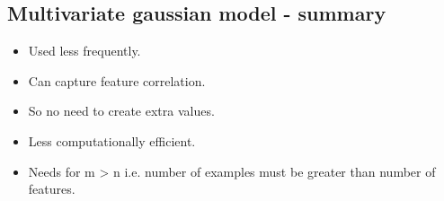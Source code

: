 \documentclass{article}
\begin{document}
\subsection*{Multivariate gaussian model - summary}

\begin{itemize}
  \item Used less frequently.
  \item Can capture feature correlation.
  \item So no need to create extra values.
  \item Less computationally efficient.
  \item Needs for m > n  i.e. number of examples must be greater than number of features.  
\end{itemize}
\end{document}
